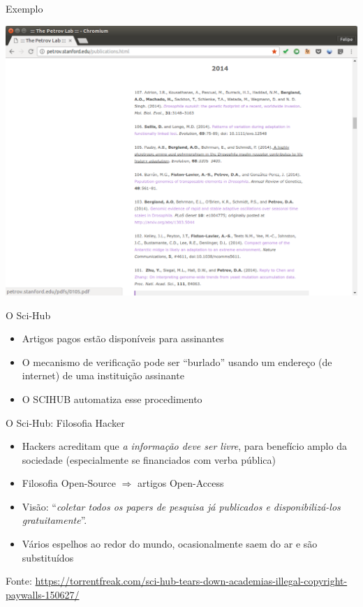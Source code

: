 \documentclass{beamer}
\begin{document}
\begin{frame}{Exemplo}
  \begin{center}
    \includegraphics[height=\textheight]{Busca/petrov2}
  \end{center}
\end{frame}

\begin{frame}{O Sci-Hub}
  \begin{itemize}
  \item Artigos pagos estão disponíveis para assinantes
  \item O mecanismo de verificação pode ser ``burlado'' usando um
    endereço (de internet) de uma instituição assinante
  \item O SCIHUB automatiza esse procedimento
  \end{itemize}
\end{frame}

\begin{frame}{O Sci-Hub: Filosofia Hacker}
  \begin{itemize}
  \item Hackers acreditam que {\em a informação deve ser livre}, para
    benefício amplo da sociedade (\alert{especialmente} se financiados
    com verba pública)
  \item Filosofia Open-Source $\Rightarrow$ artigos Open-Access
  \item Visão: ``{\em coletar todos os papers de pesquisa já
      publicados e disponibilizá-los gratuitamente}''.
  \item Vários espelhos ao redor do mundo, ocasionalmente saem do ar e
    são substituídos
  \end{itemize}

  Fonte: \url{https://torrentfreak.com/sci-hub-tears-down-academias-illegal-copyright-paywalls-150627/}
\end{frame}
\end{document}
